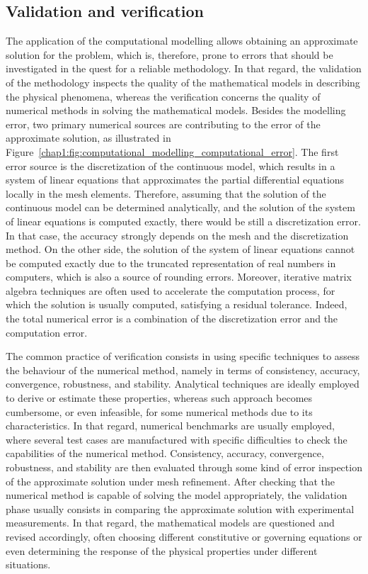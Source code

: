 \subsection{Validation and verification}
\label{chap1:subsec:computational_modelling_validation_and_verification}

The application of the computational modelling allows obtaining an approximate solution for the problem, which is, therefore, prone to errors that should be investigated in the quest for a reliable methodology.
In that regard, the validation of the methodology inspects the quality of the mathematical models in describing the physical phenomena, whereas the verification concerns the quality of numerical methods in solving the mathematical models.
Besides the modelling error, two primary numerical sources are contributing to the error of the approximate solution, as illustrated in Figure~\ref{chap1:fig:computational_modelling_computational_error}.
The first error source is the discretization of the continuous model, which results in a system of linear equations that approximates the partial differential equations locally in the mesh elements.
Therefore, assuming that the solution of the continuous model can be determined analytically, and the solution of the system of linear equations is computed exactly, there would be still a discretization error.
In that case, the accuracy strongly depends on the mesh and the discretization method.
On the other side, the solution of the system of linear equations cannot be computed exactly due to the truncated representation of real numbers in computers, which is also a source of rounding errors.
Moreover, iterative matrix algebra techniques are often used to accelerate the computation process, for which the solution is usually computed, satisfying a residual tolerance.
Indeed, the total numerical error is a combination of the discretization error and the computation error.

The common practice of verification consists in using specific techniques to assess the behaviour of the numerical method, namely in terms of consistency, accuracy, convergence, robustness, and stability.
Analytical techniques are ideally employed to derive or estimate these properties, whereas such approach becomes cumbersome, or even infeasible, for some numerical methods due to its characteristics.
In that regard, numerical benchmarks are usually employed, where several test cases are manufactured with specific difficulties to check the capabilities of the numerical method.
Consistency, accuracy, convergence, robustness, and stability are then evaluated through some kind of error inspection of the approximate solution under mesh refinement.
After checking that the numerical method is capable of solving the model appropriately, the validation phase usually consists in comparing the approximate solution with experimental measurements.
In that regard, the mathematical models are questioned and revised accordingly, often choosing different constitutive or governing equations or even determining the response of the physical properties under different situations.

